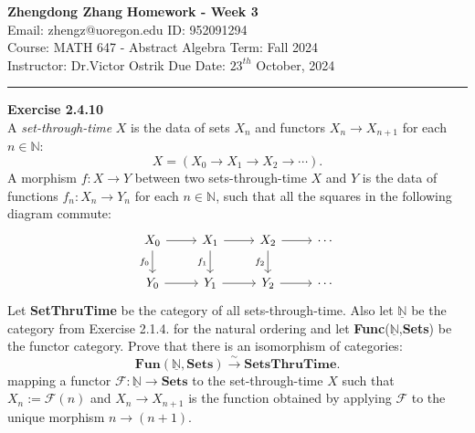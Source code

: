 \documentclass[a4paper, 11pt]{article}
\newenvironment{problem}[2][Exercise]
    { \begin{mdframed}[backgroundcolor=gray!20] \textbf{#1 #2} \\}
    {  \end{mdframed}}
\begin{document}
\noindent
\large\textbf{Zhengdong Zhang} \hfill \textbf{Homework - Week 3}   \\
Email: zhengz@uoregon.edu \hfill ID: 952091294 \\
\normalsize Course: MATH 647 - Abstract Algebra  \hfill Term: Fall 2024\\
Instructor: Dr.Victor Ostrik \hfill Due Date: $23^{th}$ October, 2024 \\
\noindent\rule{7in}{2.8pt}
\begin{problem}{2.4.10}
A \textit{set-through-time} \(X\) is the data of sets \(X_n\) and functors \(X_n\rightarrow X_{n+1}\) for each \(n\in \mathbb{N}\):
$$X=(X_0\rightarrow X_1\rightarrow X_2\rightarrow \cdots).$$
A morphism \(f:X\rightarrow Y\) between two sets-through-time \(X\) and \(Y\) is the data of functions \(f_n:X_n\rightarrow Y_n\) for each 
\(n\in \mathbb{N}\), such that all the squares in the following diagram commute:
$$\begin{tikzcd}
	{X_0} & {X_1} & {X_2} & \cdots \\
	{Y_0} & {Y_1} & {Y_2} & \cdots
	\arrow[from=1-1, to=1-2]
	\arrow["{f_0}"', from=1-1, to=2-1]
	\arrow[from=1-2, to=1-3]
	\arrow["{f_1}"', from=1-2, to=2-2]
	\arrow[from=1-3, to=1-4]
	\arrow["{f_2}"', from=1-3, to=2-3]
	\arrow[from=2-1, to=2-2]
	\arrow[from=2-2, to=2-3]
	\arrow[from=2-3, to=2-4]
\end{tikzcd}$$
Let \textbf{SetThruTime} be the category of all sets-through-time. Also let \(\underline{\mathbb{N}}\) be the category from Exercise 2.1.4. for the natural ordering 
and let \textbf{Func}(\(\underline{\mathbb{N}}\),\textbf{Sets}) be the functor category. Prove that there is an isomorphism of categories:
$$\textbf{Fun}(\underline{\mathbb{N}},\textbf{Sets})\xrightarrow{\sim} \textbf{SetsThruTime}.$$
mapping a functor \(\mathcal{F}:\underline{\mathbb{N}}\rightarrow \textbf{Sets}\) to the set-through-time \(X\) such that \(X_n:=\mathcal{F}(n)\) and \(X_n\rightarrow X_{n+1}\) 
is the function obtained by applying \(\mathcal{F}\) to the unique morphism \(n\rightarrow(n+1)\).
\end{problem}
\end{document}
